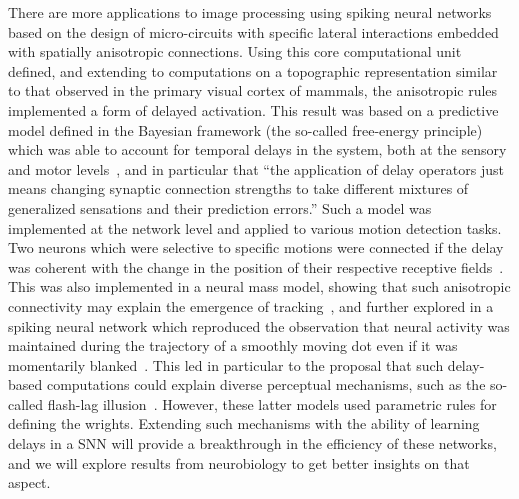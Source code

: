 \documentclass[brainsci, %
               review,submit,pdftex,moreauthors
               ]{Definitions/mdpi}
\begin{document}
There are more applications to image processing using spiking neural networks based on the design of micro-circuits with specific lateral interactions embedded with spatially anisotropic connections. Using this core computational unit defined, and extending to computations on a topographic representation similar to that observed in the primary visual cortex of mammals, the anisotropic rules implemented a form of delayed activation. This result was based on a predictive model defined in the Bayesian framework (the so-called free-energy principle) which was able to account for temporal delays in the  system, both at the sensory and motor levels~\citep{perrinet_active_2014}, and in particular that ``the application of delay operators just means changing synaptic connection strengths to take different mixtures of generalized sensations and their prediction errors.'' Such a model was implemented at the network level and applied to various motion detection tasks. Two neurons which were selective to specific motions were connected if the delay was coherent with the change in the position of their respective receptive fields~\citep{hogendoorn_predictive_2019}.  This was also implemented in a neural mass model, showing that such anisotropic connectivity may explain the emergence of tracking~\citep{khoei_motion-based_2013}, and further explored in a spiking neural network which reproduced the observation that neural activity was maintained during the trajectory of a smoothly moving dot even if it was momentarily blanked~\citep{kaplan_anisotropic_2013}. This led in particular to the proposal that such delay-based computations could explain diverse perceptual mechanisms, such as the so-called flash-lag illusion~\citep{khoei_flash-lag_2017}. However, these latter models used parametric rules for defining the wrights. Extending such mechanisms with the ability of learning delays in a SNN will provide a breakthrough in the efficiency of these networks, and we will explore results from neurobiology to get better insights on that aspect.
%
\end{document}

